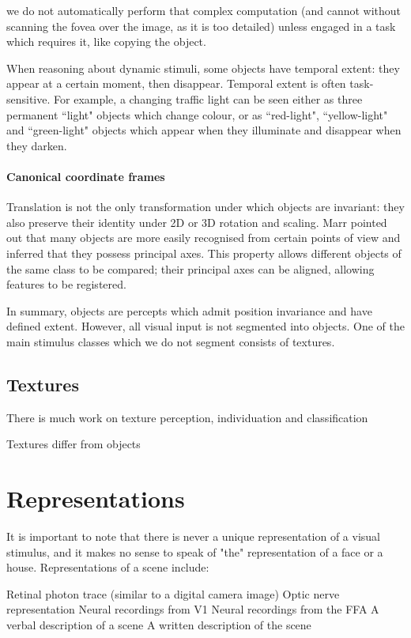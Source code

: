 we do not automatically perform that complex computation (and cannot without scanning the fovea over the image, as it is too detailed) unless engaged in a task which requires it, like copying the object.

When reasoning about dynamic stimuli, some objects have temporal extent: they appear at a certain moment, then disappear. Temporal extent is often task-sensitive. For example, a changing traffic light can be seen either as three permanent ``light" objects which change colour, or as ``red-light", ``yellow-light" and ``green-light" objects which appear when they illuminate and disappear when they darken.

\paragraph{Canonical coordinate frames}

Translation is not the only transformation under which objects are invariant: they also preserve their identity under 2D or 3D rotation and scaling. Marr pointed out that many objects are more easily recognised from certain points of view and inferred that they possess principal axes\cite{marr1982vision}. This property allows different objects of the same class to be compared; their principal axes can be aligned, allowing features to be registered.

In summary, objects are percepts which admit position invariance and have defined extent. However, all visual input is not segmented into objects. One of the main stimulus classes which we do not segment consists of textures.

\subsection{Textures}

There is much work on texture perception\cite{}, individuation\cite{} and classification\cite{}

Textures differ from objects 

\section{Representations}

It is important to note that there is never a unique representation of a visual stimulus, and it makes no sense to speak of "the" representation of a face or a house. Representations of a scene include:

Retinal photon trace (similar to a digital camera image)
Optic nerve representation
Neural recordings from V1
Neural recordings from the FFA
A verbal description of a scene
A written description of the scene

